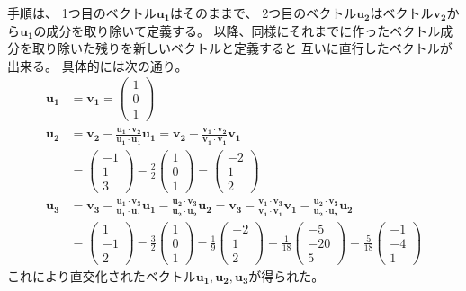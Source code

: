 \documentclass[12pt,b5paper]{ltjsarticle}
\begin{document}
手順は、
1つ目のベクトル$\bm{u_1}$はそのままで、
2つ目のベクトル$\bm{u_2}$はベクトル$\bm{v_2}$から$\bm{u_1}$の成分を取り除いて定義する。
以降、同様にそれまでに作ったベクトル成分を取り除いた残りを新しいベクトルと定義すると
互いに直行したベクトルが出来る。
具体的には次の通り。
\begin{align}
 \bm{u_1} &= \bm{v_1} = \begin{pmatrix}1\\0\\1\end{pmatrix}\\
 \bm{u_2} &= \bm{v_2}- \frac{\bm{u_1}\cdot\bm{v_2}}{\bm{u_1}\cdot\bm{u_1}}\bm{u_1}
         = \bm{v_2}- \frac{\bm{v_1}\cdot\bm{v_2}}{\bm{v_1}\cdot\bm{v_1}}\bm{v_1}\\
 &=\begin{pmatrix}-1\\1\\3\end{pmatrix} - \frac{2}{2}\begin{pmatrix}1\\0\\1\end{pmatrix}
 =\begin{pmatrix}-2\\1\\2\end{pmatrix}\\
 \bm{u_3} &= \bm{v_3}- \frac{\bm{u_1}\cdot\bm{v_3}}{\bm{u_1}\cdot\bm{u_1}}\bm{u_1}
 - \frac{\bm{u_2}\cdot\bm{v_3}}{\bm{u_2}\cdot\bm{u_2}}\bm{u_2}
= \bm{v_3}- \frac{\bm{v_1}\cdot\bm{v_3}}{\bm{v_1}\cdot\bm{v_1}}\bm{v_1}
 - \frac{\bm{u_2}\cdot\bm{v_3}}{\bm{u_2}\cdot\bm{u_2}}\bm{u_2}\\
 &= \begin{pmatrix}1\\-1\\2\end{pmatrix} - \frac{3}{2}\begin{pmatrix}1\\0\\1\end{pmatrix}
              - \frac{1}{9}\begin{pmatrix}-2\\1\\2\end{pmatrix}
               =  \frac{1}{18}\begin{pmatrix}-5\\-20\\5\end{pmatrix}
               =  \frac{5}{18}\begin{pmatrix}-1\\-4\\1\end{pmatrix}
\end{align}
これにより直交化されたベクトル$\bm{u_1},\bm{u_2},\bm{u_3}$が得られた。
\end{document}
